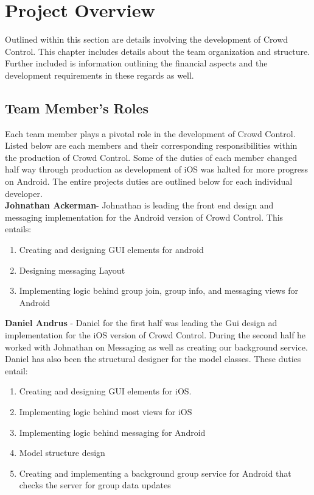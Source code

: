 

\chapter{Project Overview}

Outlined within this section are details involving the development of Crowd Control.  This chapter includes details about the team organization and structure.  Further included is information outlining the financial aspects and the development requirements in these regards as well. 



\section{Team Member's Roles}
Each team member plays a pivotal role in the development of Crowd Control.  Listed below are each members and their corresponding responsibilities within the production of Crowd Control.  Some of the duties of each member changed half way through production as development of iOS was halted for more progress on Android.  The entire projects duties are outlined below for each individual developer.  \\

\textbf{Johnathan Ackerman}- Johnathan is leading the front end design and messaging implementation for the Android version of Crowd Control. This entails: 
	\begin {enumerate}
	\item Creating and designing GUI elements for android
	\item Designing messaging Layout
	\item Implementing logic behind group join, group info, and messaging views for Android
	\end{enumerate}

\textbf{Daniel Andrus} - Daniel for the first half was leading the Gui design ad implementation for the iOS version of Crowd Control.  During the second half he worked with Johnathan on Messaging as well as creating our background service.  Daniel has also been the structural designer for the model classes. These duties entail:
	\begin {enumerate}
	\item Creating and designing GUI elements for iOS.
	\item Implementing logic behind most views for iOS
	\item Implementing logic behind messaging for Android
	\item Model structure design
	\item Creating and implementing a background group service for Android that checks the server for group data updates
	\end{enumerate}

